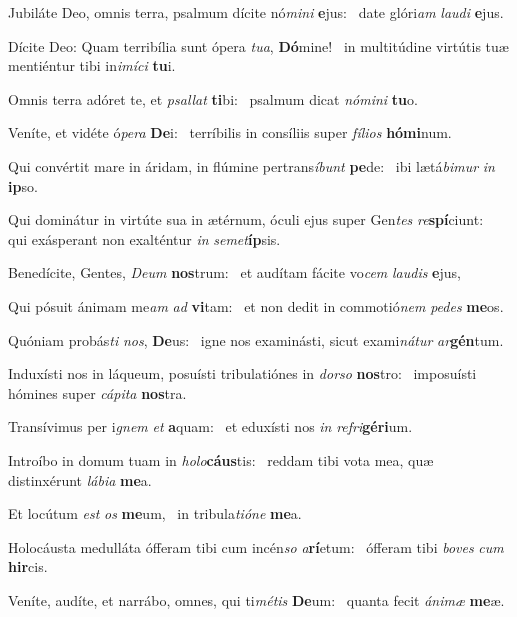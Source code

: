 \item Jubiláte Deo, omnis terra, psalmum dícite nó\textit{mini} \textbf{e}jus:~\psstar{} date glóri\textit{am} \textit{laudi} \textbf{e}jus.
\item Dícite Deo: Quam terribília sunt ópera \textit{tua}, \textbf{Dó}mine!~\psstar{} in multitúdine virtútis tuæ mentiéntur tibi in\textit{imíci} \textbf{tu}i.
\item Omnis terra adóret te, et \textit{psallat} \textbf{ti}bi:~\psstar{} psalmum dicat \textit{nómini} \textbf{tu}o.
\item Veníte, et vidéte ó\textit{pera} \textbf{De}i:~\psstar{} terríbilis in consíliis super \textit{fílios} \textbf{hó}\textbf{mi}num.
\item Qui convértit mare in áridam, in flúmine pertrans\textit{íbunt} \textbf{pe}de:~\psstar{} ibi lætá\textit{bimur} \textit{in} \textbf{ip}so.
\item Qui dominátur in virtúte sua in ætérnum, óculi ejus super Gen\textit{tes} \textit{re}\textbf{spí}ciunt:~\psstar{} qui exásperant non exalténtur \textit{in} \textit{semet}\textbf{íp}sis.
\item Benedícite, Gentes, \textit{Deum} \textbf{nos}trum:~\psstar{} et audítam fácite vo\textit{cem} \textit{laudis} \textbf{e}jus,
\item Qui pósuit ánimam me\textit{am} \textit{ad} \textbf{vi}tam:~\psstar{} et non dedit in commotió\textit{nem} \textit{pedes} \textbf{me}os.
\item Quóniam probás\textit{ti} \textit{nos}, \textbf{De}us:~\psstar{} igne nos examinásti, sicut exami\textit{nátur} \textit{ar}\textbf{gén}tum.
\item Induxísti nos in láqueum, posuísti tribulatiónes in \textit{dorso} \textbf{nos}tro:~\psstar{} imposuísti hómines super \textit{cápita} \textbf{nos}tra.
\item Transívimus per i\textit{gnem} \textit{et} \textbf{a}quam:~\psstar{} et eduxísti nos \textit{in} \textit{refri}\textbf{gé}\textbf{ri}um.
\item Introíbo in domum tuam in \textit{holo}\textbf{cáus}tis:~\psstar{} reddam tibi vota mea, quæ distinxérunt \textit{lábia} \textbf{me}a.
\item Et locútum \textit{est} \textit{os} \textbf{me}um,~\psstar{} in tribula\textit{tióne} \textbf{me}a.
\item Holocáusta medulláta ófferam tibi cum incén\textit{so} \textit{a}\textbf{rí}etum:~\psstar{} ófferam tibi \textit{boves} \textit{cum} \textbf{hir}cis.
\item Veníte, audíte, et narrábo, omnes, qui ti\textit{métis} \textbf{De}um:~\psstar{} quanta fecit \textit{ánimæ} \textbf{me}æ.
